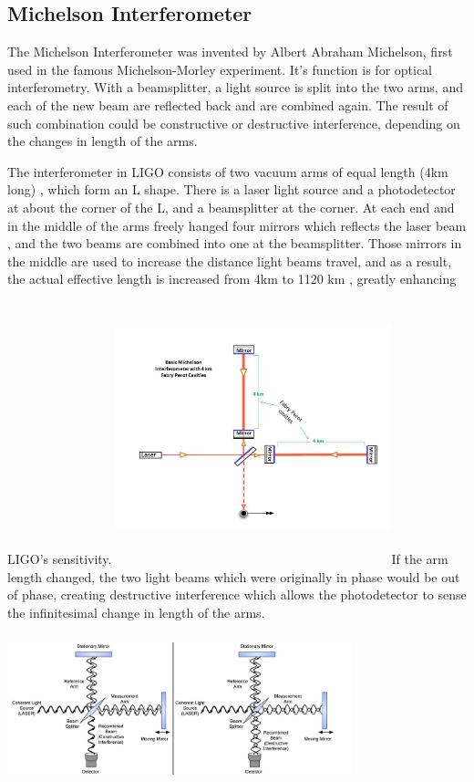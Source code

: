 \documentclass[aps,prl,preprint]{revtex4}
\begin{document}
\subsection{Michelson Interferometer}
The Michelson Interferometer was invented by Albert Abraham Michelson, first used in the famous Michelson-Morley experiment. It's function is for optical interferometry. With a beamsplitter, a light source is split into the two arms, and each of the new beam are reflected back and are combined again. The result of such combination could be constructive or destructive interference, depending on the changes in length of the arms.

The interferometer in LIGO consists of two vacuum arms \cite{MITLIGO} of equal length (4km long) \cite{MITLIGO}, which form an L shape. There is a laser light source and a photodetector at about the corner of the L, and a beamsplitter at the corner. At each end and in the middle of the arms freely hanged four mirrors which reflects the laser beam \cite{Interferometer}, and the two beams are combined into one at the beamsplitter. Those mirrors in the middle are used to increase the distance light beams travel, and as a result, the actual effective length is increased from 4km to 1120 km \cite{Interferometer}, greatly enhancing LIGO's sensitivity. \newline\includegraphics[height = 8cm, width=8cm]{LIGOInterferometer}\newline If the arm length changed, the two light beams which were originally in phase would be out of phase, creating destructive interference which allows the photodetector to sense the infinitesimal change in length of the arms. \newline\includegraphics[height=5cm, width= 10cm]{Interferometer}
\end{document}
